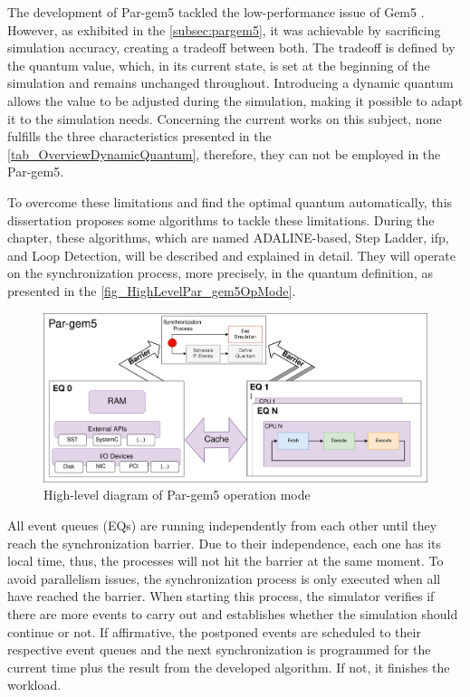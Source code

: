 
The development of Par-gem5 \cite{pargem5} tackled the low-performance issue of Gem5 \cite{TheGem5Simulator}. However, as exhibited in the 
\autoref{subsec:pargem5}, it was achievable by sacrificing simulation accuracy, creating a tradeoff between both. 
The tradeoff is defined by the quantum value, which, in its current state, is set at the beginning of the simulation and remains unchanged 
throughout. Introducing a dynamic quantum allows the value to be adjusted during the simulation, making it possible to adapt it to the 
simulation needs. Concerning the current works on this subject, none fulfills the three characteristics presented in the 
\autoref{tab_OverviewDynamicQuantum}, therefore, they can not be employed in the Par-gem5. 

To overcome these limitations and find the optimal quantum automatically, this dissertation proposes some algorithms to tackle these limitations.   
During the chapter, these algorithms, which are named ADALINE-based, Step Ladder, \gls{ifp}, and Loop Detection, will be described 
and explained in detail. They will operate on the synchronization process, more precisely, in the quantum definition, as presented 
in the \autoref{fig_HighLevelPar_gem5OpMode}.

\begin{figure}[]
	\centering
 	\includegraphics[width=0.8\linewidth]{Images/HighLevelPar_gem5OpMode.png}
 	\caption{High-level diagram of Par-gem5 operation mode}
	\label{fig_HighLevelPar_gem5OpMode}
\end{figure}


All event queues (EQs) are running independently from each other until they reach the synchronization barrier. 
Due to their independence, each one has its local time, thus, the processes will not hit the barrier at the same moment. 
To avoid parallelism issues, the synchronization process is only executed when all have reached the barrier. When starting this 
process, the simulator verifies if there are more events to carry out and establishes whether the simulation should continue or not.
If affirmative, the postponed events are scheduled to their respective event queues and the next synchronization is programmed for 
the current time plus the result from the developed algorithm. If not, it finishes the workload.

